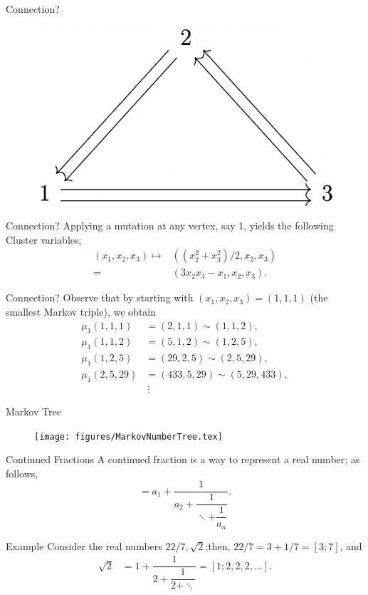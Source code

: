 \documentclass{beamer}
\begin{document}
\begin{frame}{Connection?}
\begin{figure}
    \centering
    \includegraphics[width = 5 cm
]{Images/MarkovQuiverImgPres.png}
\end{figure}
\end{frame}
\begin{frame}{Connection?}
    Applying a mutation at any vertex, say 1, yields the following Cluster variables;
    \begin{align*}
        (x_1,x_2,x_3) \mapsto &((x_2^2 + x^2_3)/2, x_2,x_3) \\
        =&(3x_2x_3 - x_1,x_2,x_3).
    \end{align*}
\end{frame}
\begin{frame}{Connection?}
    Observe that by starting with $(x_1,x_2,x_3) = (1,1,1)$ (the smallest Markov triple), we obtain
    \begin{align*}
    \mu_1(1,1,1) &= (2,1,1) \sim (1,1,2), \\
    \mu_1(1,1,2) &= (5,1,2) \sim (1,2,5), \\
    \mu_1(1,2,5) &= (29,2,5) \sim (2,5,29), \\
    \mu_1(2,5,29) &= (433,5,29) \sim (5,29,433), \\
    & \ \vdots
\end{align*}
\end{frame}
\begin{frame}{Markov Tree}
\begin{figure}
    \centering
    \texttt{[image: figures/MarkovNumberTree.tex]}
\end{figure}    
\end{frame}
\begin{frame}{Continued Fractions}
A continued fraction is a way to represent a real number; as follows, \pausa
\begin{equation*}
    [a_1,a_2,\dots,a_n] = a_1 + \dfrac{1}{a_2+\dfrac{1}{\ddots + \dfrac{1}{a_n}}}.
\end{equation*}
\pause
\begin{exampleblock}{Example}
    Consider the real numbers $22/7,\sqrt{2}$;\pause  then, $22/7 = 3+1/7 = [3;7]$, and 
    \pause
\begin{align*}
    \sqrt{2} &= 1 + \dfrac{1}{2+ \dfrac{1}{2 + \ddots}} = [1;2,2,2,\dots].
\end{align*} 
\end{exampleblock}
\end{frame}
\end{document}
